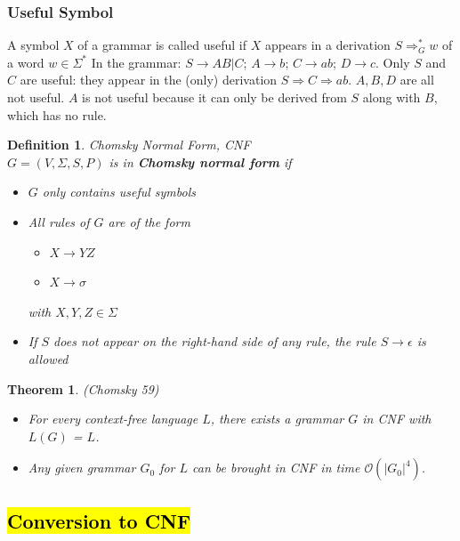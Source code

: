 \documentclass[a3paper, 8pt]{extarticle}
\newtheorem{theorem}{Theorem}[section]
\newtheorem*{definition}{Definition}
\begin{document}
\begin{multicols*}{6}
\subsubsection{Useful Symbol}
A symbol $X$ of a grammar is called useful if $X$ appears in a derivation $S \Rightarrow_G^* w$ of a word $w \in \Sigma^*$ In the grammar: $S \to AB | C$;
 $A \to b$;
 $C \to ab$;
$D \to c$. Only $S$ and $C$ are useful: they appear in the (only) derivation $S \Rightarrow C \Rightarrow ab$. $A, B,D$ are all not useful. $A$ is not useful because it can only be derived from $S$ along with $B$, which has no rule.

\begin{definition}
    Chomsky Normal Form, CNF\\
    $G = (V,\Sigma, S, P)$ is in \textbf{Chomsky normal form} if \begin{itemize}
        \item $G$ only contains useful symbols
        \item All rules of $G$ are of the form \begin{itemize}
            \item $X \to YZ$
            \item $X \to \sigma$
        \end{itemize} with $X,Y,Z \in \Sigma$
        \item If $S$ does not appear on the right-hand side of any rule, the rule $S \to \epsilon$ is allowed
    \end{itemize}
\end{definition}

\begin{theorem} (Chomsky 59)
\begin{itemize}
    \item For every context-free language $L$, there exists a grammar $G$ in CNF with $L(G)$ = $L$. 
    \item Any given grammar $G_0$ for $L$ can be brought in CNF in time $\mathcal{O}(|G_0|^4)$.
\end{itemize}
\end{theorem}

\subsection{\hl{Conversion to CNF}} 


\end{multicols*}
\end{document}
